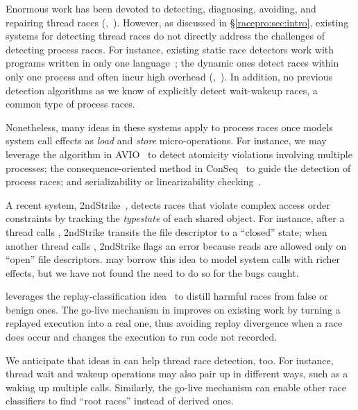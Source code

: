   Enormous work has been devoted to detecting,
diagnosing, avoiding, and repairing thread races
(\eg,~\cite{racerx:sosp03,chord:pldi06,pinsel:pldi07,racefuzzer:pldi08,wu:loom:osdi10,yu:racetrack:sosp}).
However, as discussed in \S\ref{racepro:sec:intro}, existing systems for detecting
thread races do not directly address the challenges of detecting process
races.  For instance, existing static race detectors work with programs
written in only one language~\cite{racerx:sosp03,chord:pldi06}; the
dynamic ones detect races within only one process and often incur high
overhead (\eg,~\cite{musuvathi:chess:osdi08}).  In addition, no previous
detection algorithms as we know of explicitly detect wait-wakeup races, a
common type of process races.

Nonetheless, many ideas in these systems apply to process races once \racepro
models system call effects as \emph{load} and \emph{store} micro-operations. 
For instance, we may leverage the algorithm in AVIO~\cite{avio:asplos06} to
detect atomicity violations involving multiple processes; the
consequence-oriented method in ConSeq~\cite{conseq:asplos11} to guide the
detection of process races; and serializability or linearizability
checking~\cite{linearizable:eurosys11}.

A recent system, 2ndStrike~\cite{2ndstrike:asplos11}, detects races that
violate complex access order constraints by tracking the \emph{typestate}
of each shared object.  For instance, after a thread calls ,
2ndStrike transits the file descriptor to a ``closed'' state; when another
thread calls , 2ndStrike flags an error because reads are
allowed only on ``open'' file descriptors.  \racepro may borrow this idea to
model system calls with richer effects, but we have not found the need to
do so for the bugs \racepro caught.

\racepro leverages the replay-classification idea~\cite{pinsel:pldi07} to
distill harmful races from false or benign ones.  The go-live mechanism in
\racepro improves on existing work by turning a replayed execution into a
real one, thus avoiding replay divergence when a race does occur and
changes the execution to run code not recorded.

We anticipate that ideas in \racepro can help thread race detection, too.  For
instance, thread wait and wakeup operations may also pair up in different
ways, such as a  waking up multiple
 calls.  Similarly, the go-live mechanism can
enable other race classifiers to find ``root races'' instead of derived
ones.

